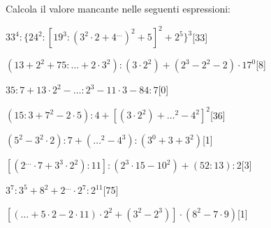 Calcola il valore mancante nelle seguenti espressioni:

\begin{esercizio} \label{ese:1.17}
\(33^4:\{24^2:[19^3:(3^2\cdot2+4^{\dots})^2+5]^2+2^{5}\}^3\)\hfill[33]
\end{esercizio}
\begin{esercizio} \label{ese:1.17}
\((13+2^2+75:{\dots}+2\cdot3^2):(3\cdot2^2)+(2^3-2^2-2)\cdot17^0\)\hfill[8]
\end{esercizio}
\begin{esercizio} \label{ese:1.17}
\(35:7+13\cdot2^2-{\dots}:2^3-11\cdot3-84:7\)\hfill[0]
\end{esercizio}
\begin{esercizio} \label{ese:1.17}
\((15:3+7^2-2\cdot5):4+[(3\cdot2^2)+{\dots}^2-4^2]^2\)\hfill[36]
\end{esercizio}
\begin{esercizio} \label{ese:1.17}
\((5^2-3^2\cdot2):7+({\dots}^2-4^3):(3^0+3+3^2)\)\hfill[1]
\end{esercizio}
\begin{esercizio} \label{ese:1.17}
\([(2^{\dots}\cdot7+3^3\cdot2^2):11]:(2^3\cdot15-10^2)+(52:13):2\)\hfill[3]
\end{esercizio}
\begin{esercizio} \label{ese:1.17}
\(3^7:3^5+8^2+2^{\dots}\cdot2^7:2^{11}\)\hfill[75]
\end{esercizio}
\begin{esercizio} \label{ese:1.17}
\([({\dots}+5\cdot2-2\cdot11)\cdot2^2+(3^2-2^3)]\cdot(8^2-7\cdot9)\)\hfill[1]
\end{esercizio}

